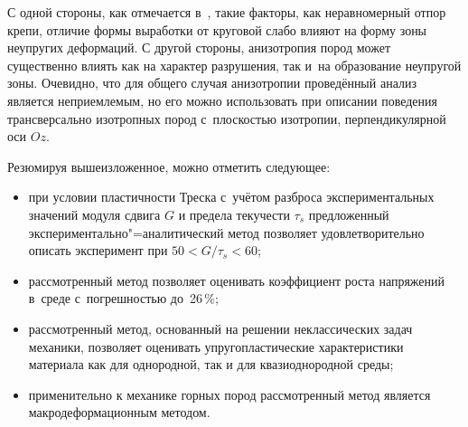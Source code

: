 \pagebreak

С одной стороны, как отмечается в~\cite{shvab:bib6}, такие факторы, как неравномерный отпор крепи, отличие формы выработки от круговой слабо влияют на форму зоны неупругих деформаций. 
С другой стороны, анизотропия пород может существенно влиять как на характер разрушения, так и~на образование неупругой зоны.
Очевидно, что для общего случая анизотропии проведённый анализ является неприемлемым, но его можно использовать при описании поведения трансверсально изотропных пород с~плоскостью изотропии, перпендикулярной оси $Oz$.

%

\smallskip

Резюмируя вышеизложенное, можно отметить следующее:
\begin{itemize}
\item[1)] при условии пластичности Треска с~учётом разброса экспериментальных значений модуля сдвига $G$ и предела текучести $\tau_s$ предложенный экспериментально"=аналитический метод позволяет  удовлетворительно описать эксперимент при $50 < G/\tau _s < 60$;
\item[2)]  рассмотренный метод позволяет оценивать коэффициент роста напряжений в~среде с~погрешностью до~26\,{\%};

\item[3)]  рассмотренный метод, основанный на решении неклассических задач механики, позволяет оценивать упругопластические
характеристики материала как для однородной, так и для квазиоднородной среды;

\item[4)]  применительно к механике горных пород рассмотренный метод является макродеформационным методом.

\end{itemize}

